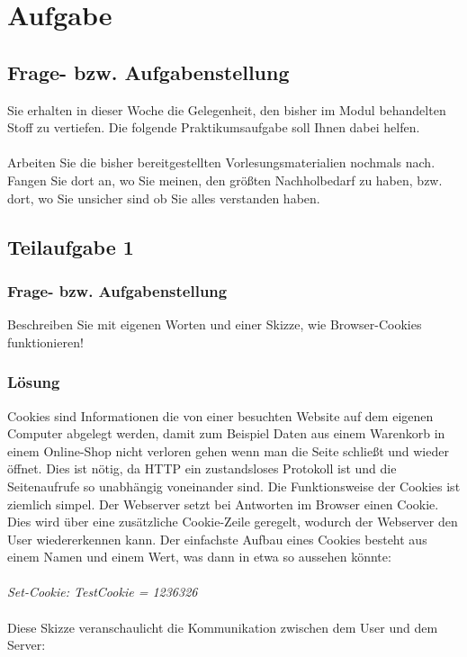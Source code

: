 \newcommand{\env}[1]{\texttt{#1}}
\newcommand{\command}[1]{\texttt{#1}}
\newcommand{\package}[1]{\texttt{\itshape#1}}
\newcommand{\engl}[1]{(engl: \textit{#1})\xspace}
\setlength{\parindent}{0pt}
\lstset{extendedchars=\true}
\lstset{inputencoding=ansinew}
\newcommand\tab[1][1cm]{\hspace*{#1}}
\newpage

\section{Aufgabe}

\subsection{Frage- bzw. Aufgabenstellung}

Sie erhalten in dieser Woche die Gelegenheit, den bisher im Modul behandelten Stoff zu vertiefen.
Die folgende Praktikumsaufgabe soll Ihnen dabei helfen. \\
\\
Arbeiten Sie die bisher bereitgestellten Vorlesungsmaterialien nochmals nach. Fangen Sie dort
an, wo Sie meinen, den größten Nachholbedarf zu haben, bzw. dort, wo Sie unsicher sind ob
Sie alles verstanden haben.

\subsection{Teilaufgabe 1}

\subsubsection{Frage- bzw. Aufgabenstellung}
Beschreiben Sie mit eigenen Worten und einer Skizze, wie Browser-Cookies funktionieren!

\subsubsection{Lösung}\cite{[1]}
Cookies sind Informationen die von einer besuchten Website auf dem eigenen Computer abgelegt werden, damit zum Beispiel Daten aus einem Warenkorb in einem Online-Shop nicht verloren gehen wenn man die Seite schließt und wieder öffnet. Dies ist nötig, da HTTP ein zustandsloses Protokoll ist und die Seitenaufrufe so unabhängig voneinander sind. Die Funktionsweise der Cookies ist ziemlich simpel. Der Webserver setzt bei Antworten im Browser einen Cookie. Dies wird über eine zusätzliche Cookie-Zeile geregelt, wodurch der Webserver den User wiedererkennen kann. Der einfachste Aufbau eines Cookies besteht aus einem Namen und einem Wert, was dann in etwa so aussehen könnte: \\
\\
\textit{Set-Cookie: TestCookie = 1236326} \\
\\
Diese Skizze veranschaulicht die Kommunikation zwischen dem User und dem Server: 

